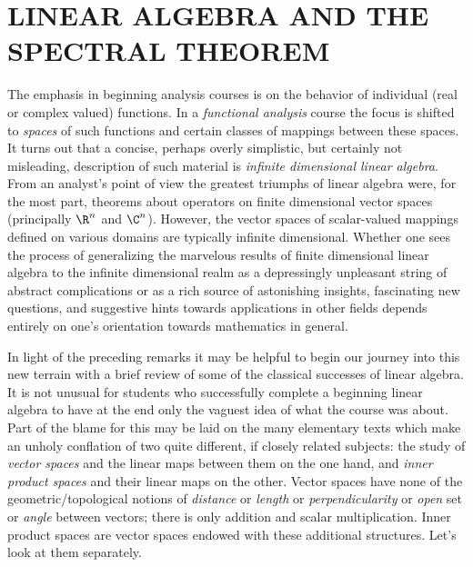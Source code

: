 \chapter{LINEAR ALGEBRA AND THE SPECTRAL THEOREM}

The emphasis in beginning analysis courses is on the behavior of individual (real or complex valued) functions.  In a \emph{functional analysis}
course the focus is shifted to \emph{spaces} of such functions and certain classes of mappings between these spaces.  It turns out that a concise,
perhaps overly simplistic, but certainly not misleading, description of such material is \emph{infinite dimensional linear algebra}.  From an
analyst's point of view the greatest triumphs of linear algebra were, for the most part, theorems about operators on finite dimensional vector
spaces (principally $\R^n$ and $\C^n$).  However, the vector spaces of scalar-valued mappings defined on various domains are typically infinite
dimensional.  Whether one sees the process of generalizing the marvelous results of finite dimensional linear algebra to the infinite dimensional
realm as a depressingly unpleasant string of abstract complications or as a rich source of astonishing insights, fascinating new questions, and
suggestive hints towards applications in other fields depends entirely on one's orientation towards mathematics in general.

In light of the preceding remarks it may be helpful to begin our journey into this new terrain with a brief review of some of the classical
successes of linear algebra.  It is not unusual for students who successfully complete a beginning linear algebra to have at the end only the
vaguest idea of what the course was about.  Part of the blame for this may be laid on the many elementary texts which make an unholy conflation
of two quite different, if closely related subjects: the study of \emph{vector spaces} and the linear maps between them on the one hand, and
\emph{inner product spaces} and their linear maps on the other.  Vector spaces have none of the geometric/topological notions of \emph{distance}
or \emph{length} or \emph{perpendicularity} or \emph{open} set or \emph{angle} between vectors; there is only addition and scalar multiplication.
Inner product spaces are vector spaces endowed with these additional structures.  Let's look at them separately.


